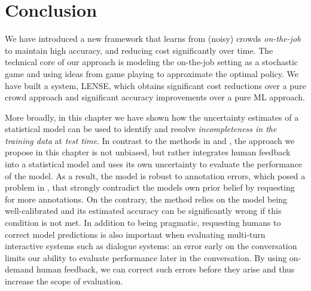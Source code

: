 \section{Conclusion}
\label{sec:conclusion}

We have introduced a new framework that learns from (noisy) crowds \emph{on-the-job}
to maintain high accuracy, and reducing cost significantly over time.
The technical core of our approach is modeling the on-the-job setting
as a stochastic game and using ideas from game playing to approximate the optimal policy.
We have built a system, LENSE, %
which obtains significant cost reductions over a pure crowd approach
and significant accuracy improvements over a pure ML approach.

More broadly, in this chapter we have shown how the uncertainty estimates of a statistical model can be used to identify and resolve \textit{incompleteness in the training data} at \textit{test time}.
In contrast to the methods in  and , the approach we propose in this chapter is not unbiased, but rather integrates human feedback into a statistical model and uses its own uncertainty to evaluate the performance of the model.
As a result, the model is robust to annotation errors, which posed a problem in , that strongly contradict the models own prior belief by requesting for more annotations.
On the contrary, the method relies on the model being well-calibrated and its estimated accuracy can be significantly wrong if this condition is not met.
In addition to being pragmatic, requesting humans to correct model predictions is also important when evaluating multi-turn interactive systems such as dialogue systems:
  an error early on the conversation limits our ability to evaluate performance later in the conversation. 
By using on-demand human feedback, we can correct such errors before they arise and thus increase the scope of evaluation.
